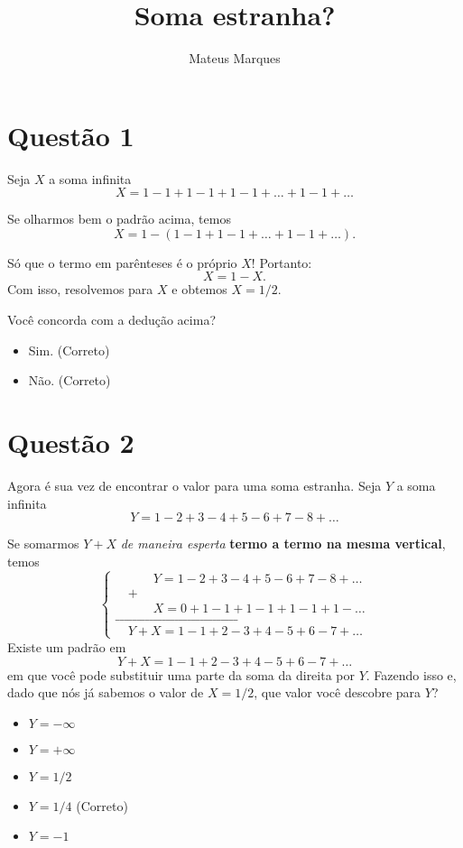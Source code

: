 \documentclass[a4paper,fleqn,12pt]{article}
\title{\Huge{\textbf{Soma estranha?}}}
\author{Mateus Marques}
\begin{document}
\maketitle

\section{Questão 1}

Seja \(X\) a soma infinita
$$
X = 1 - 1 + 1 - 1 + 1 - 1 + \ldots + 1 - 1 + \ldots
$$

Se olharmos bem o padrão acima, temos
$$
X = 1 - (1 - 1 + 1 - 1 + \ldots + 1 - 1 + \ldots).
$$

Só que o termo em parênteses é o próprio \(X\)! Portanto:
$$
X = 1 - X.
$$
Com isso, resolvemos para \(X\) e obtemos \(X = 1/2\).

Você concorda com a dedução acima?
\begin{itemize}
\item Sim. (Correto)
\item Não. (Correto)
\end{itemize}

\section{Questão 2}

Agora é sua vez de encontrar o valor para uma soma estranha. Seja \(Y\) a soma infinita
$$
Y = 1 - 2 + 3 - 4 + 5 - 6 + 7 - 8 + \ldots
$$

Se somarmos \(Y + X\) \textit{de maneira esperta} \textbf{termo a termo na mesma vertical}, temos
$$
\begin{cases}
\quad \quad \quad Y = 1 - 2 + 3 - 4 + 5 - 6 + 7 - 8 + \ldots \\
\quad + \\
\quad \quad \quad X = 0 + 1 - 1 + 1 - 1 + 1 - 1 + 1 - \ldots \\
\_\_\_\_\_\_\_\_\_\_\_\_\_\_\_\_\_\_\_\_\_\_\_\_\_\_\_\_\_ \\
\quad Y+X = 1 - 1 + 2 - 3 + 4 - 5 + 6 - 7 + \ldots
\end{cases}
$$
Existe um padrão em
$$
Y+X = 1 - 1 + 2 - 3 + 4 - 5 + 6 - 7 + \ldots
$$
em que você pode substituir uma parte da soma da direita por \(Y\). Fazendo isso e, dado que nós já sabemos o valor de \(X = 1/2\), que valor você descobre para \(Y\)?
\begin{itemize}
\item \(Y = -\infty\)
\item \(Y = +\infty\)
\item \(Y = 1/2\)
\item \(Y = 1/4\) (Correto)
\item \(Y = -1\)
\end{itemize}
\end{document}
